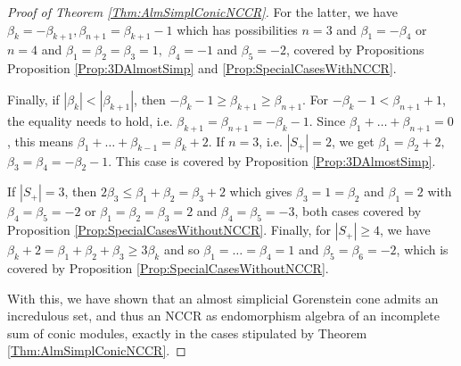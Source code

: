 \documentclass[reqno, 12pt]{amsart}
\theoremstyle{definition}
\numberwithin{equation}{section}
\begin{document}
\begin{proof}[Proof of Theorem \ref{Thm:AlmSimplConicNCCR}]
For the latter, we have $\beta_k=-\beta_{k+1}, \beta_{n+1}=\beta_{k+1}-1$ which has possibilities $n=3$ and $\beta_1=-\beta_4$ or $n=4$ and $\beta_1=\beta_2=\beta_3=1,$ $\beta_4=-1$ and $\beta_5=-2$, covered by Propositions Proposition \ref{Prop:3DAlmostSimp} and \ref{Prop:SpecialCasesWithNCCR}.

Finally, if $|\beta_k|<|\beta_{k+1}|$, then $-\beta_k-1\ge \beta_{k+1}\ge \beta_{n+1}$. For $-\beta_k-1<\beta_{n+1}+1$, the equality needs to hold, i.e. $\beta_{k+1}=\beta_{n+1}=-\beta_k-1$. Since $\beta_1+\dots+\beta_{n+1}=0$, this means $\beta_1+\dots+\beta_{k-1}=\beta_k+2$. If $n=3$, i.e. $|S_+|=2$, we get $\beta_1=\beta_2+2,$ $\beta_3=\beta_4=-\beta_2-1$. This case is covered by Proposition \ref{Prop:3DAlmostSimp}. 

If $|S_+|=3$, then $2\beta_3\le \beta_1+\beta_2=\beta_3+2$ which gives
$\beta_3=1=\beta_2$ and $\beta_1=2$ with $\beta_4=\beta_5=-2$ or $\beta_1=\beta_2=\beta_3=2$ and $\beta_4=\beta_5=-3$, both cases covered by Proposition \ref{Prop:SpecialCasesWithoutNCCR}.
Finally, for $|S_+|\ge 4$, we have $\beta_k+2=\beta_1+\beta_2+\beta_3\ge 3\beta_k$ and so $\beta_1=\dots=\beta_4=1$ and $\beta_5=\beta_6=-2$, which is covered by Proposition \ref{Prop:SpecialCasesWithoutNCCR}. 

With this, we have shown that an almost simplicial Gorenstein cone admits an incredulous set, and thus an NCCR as endomorphism algebra of an incomplete sum of conic modules, exactly in the cases stipulated by Theorem \ref{Thm:AlmSimplConicNCCR}.
\end{proof}




\end{document}

